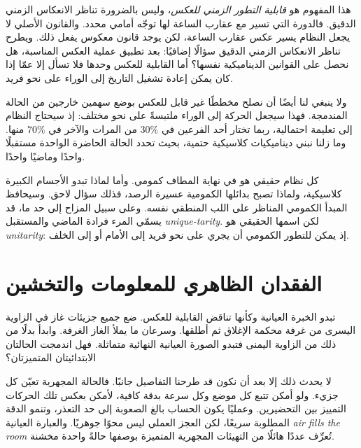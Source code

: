 هذا المفهوم هو \emph{قابلية التطور الزمني للعكس}، وليس بالضرورة تناظر الانعكاس الزمني الدقيق. فالدورة التي تسير مع عقارب الساعة لها توجّه أمامي محدد. والقانون الأصلي لا يجعل النظام يسير عكس عقارب الساعة، لكن يوجد قانون معكوس يفعل ذلك. ويطرح تناظر الانعكاس الزمني الدقيق سؤالًا إضافيًا: بعد تطبيق عملية العكس المناسبة، هل نحصل على القوانين الديناميكية نفسها؟ أما القابلية للعكس وحدها فلا تسأل إلا عمّا إذا كان يمكن إعادة تشغيل التاريخ إلى الوراء على نحو فريد.

\begin{classroomqa}
\end{classroomqa}

ولا ينبغي لنا أيضًا أن نصلح مخططًا غير قابل للعكس بوضع سهمين خارجين من الحالة المندمجة. فهذا سيجعل الحركة إلى الوراء ملتبسةً على نحو مختلف: إذ سيحتاج النظام إلى تعليمة احتمالية، ربما تختار أحد الفرعين في \(30\%\) من المرات والآخر في \(70\%\) منها. وما زلنا نبني ديناميكيات كلاسيكية حتمية، بحيث تحدد الحالة الحاضرة الواحدة مستقبلًا واحدًا وماضيًا واحدًا.

كل نظام حقيقي هو في نهاية المطاف كمومي. وأما لماذا تبدو الأجسام الكبيرة كلاسيكية، ولماذا تصبح بدائلها الكمومية عسيرة الرصد، فذلك سؤال لاحق. وسيحافظ المبدأ الكمومي المناظر على اللب المنطقي نفسه. وعلى سبيل المزاح إلى حد ما، قد يسمّي المرء فرادة الماضي والمستقبل \emph{unique-tarity}. لكن اسمها الحقيقي هو \emph{unitarity}: إذ يمكن للتطور الكمومي أن يجري على نحو فريد إلى الأمام أو إلى الخلف.

\section{الفقدان الظاهري للمعلومات والتخشين}

تبدو الخبرة العيانية وكأنها تناقض القابلية للعكس. ضع جميع جزيئات غاز في الزاوية اليسرى من غرفة محكمة الإغلاق ثم أطلقها. وسرعان ما يملأ الغاز الغرفة. وابدأ بدلًا من ذلك من الزاوية اليمنى فتبدو الصورة العيانية النهائية متماثلة. فهل اندمجت الحالتان الابتدائيتان المتميزتان؟

لا يحدث ذلك إلا بعد أن نكون قد طرحنا التفاصيل جانبًا. فالحالة المجهرية تعيّن كل جزيء. ولو أمكن تتبع كل موضع وكل سرعة بدقة كافية، لأمكن بعكس تلك الحركات التمييز بين التحضيرين. وعمليًا يكون الحساب بالغ الصعوبة إلى حد التعذر، وتنمو الدقة المطلوبة سريعًا، لكن العجز العملي ليس محوًا جوهريًا. والعبارة العيانية \emph{air fills the room} تُعرِّف عددًا هائلًا من التهيئات المجهرية المتميزة بوصفها حالةً واحدة مخشنة.

